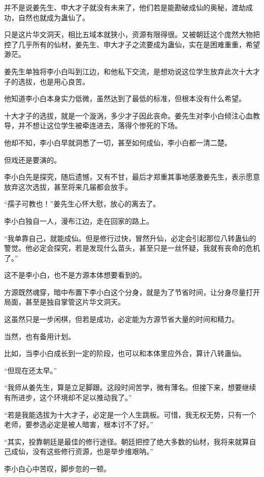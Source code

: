 \begin{this_body}
并不是说姜先生、申大才子就没有未来了，他们若是能勘破成仙的奥秘，渡劫成功，自然也就成为蛊仙了。

只是这片华文洞天，相比五域本就狭小，资源有限得很。又被朝廷这个庞然大物把控了几乎所有的仙材，姜先生、申大才子之流要成为蛊仙，实在是困难重重，希望渺茫。

姜先生单独将李小白叫到江边，和他私下交流，是想劝说这位学生放弃此次十大才子的选拔，也是用心良苦。

他知道李小白本身实力低微，虽然达到了最低的标准，但根本没有什么希望。

十大才子的选拔，就是一个漩涡，多少才子因此丧命。姜先生对李小白倾注心血教导，并不想让这位学生被牵连进去，落得个惨死的下场。

他却不知，李小白早就洞悉了一切，甚至如何成仙，李小白都一清二楚。

但戏还是要演的。

李小白先是探究，随后遗憾，又有不甘，最后才郑重其事地感激姜先生，表示愿意放弃这次选拔，甚至将来几届都会放手。

“孺子可教也！”姜先生心怀大慰，放心的离去了。

李小白独自一人，漫布江边，走在回家的路上。

“我单靠自己，就能成仙。但是修行过快，冒然升仙，必定会引起那位八转蛊仙的警觉。他必定会探究，若是发现什么苗头，甚至只是一丝怀疑，我就有丧命的危机了。”

这不是李小白，也不是方源本体想要看到的。

方源既然魂穿，暗中布置下李小白这个分身，就是为了节省时间，让分身尽量打开局面，甚至是独自掌管这片华文洞天。

这虽然只是一步闲棋，但若是成功，必定能为方源节省大量的时间和精力。

当然，也有备用计划。

比如，当李小白成长到一定的阶段，也可以和本体里应外合，算计八转蛊仙。

“但现在还太早。”

“我师从姜先生，算是立足脚跟。这段时间苦学，微有薄名。但接下来，想要继续有所进步，这个环境却不足以推动我了。”

“若是我能选拔为十大才子，必定是一个人生跳板。可惜，我无权无势，只有一个老师，要参选必定是被人暗害，根本讨不了好。”

“其实，投靠朝廷是最佳的修行途径。朝廷把控了绝大多数的仙材，我将来就算自己成仙，没有这些修行资源，也是举步维艰呐。”

李小白心中苦叹，脚步忽的一顿。


\end{this_body}
